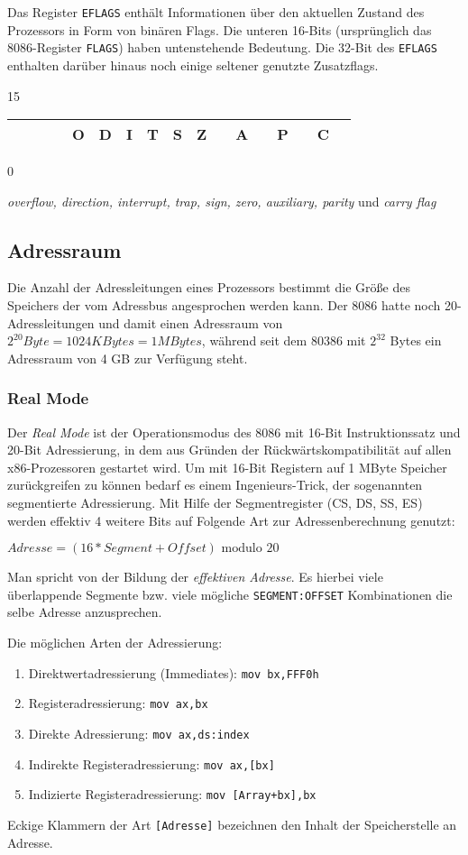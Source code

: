 Das Register {\tt EFLAGS} enthält Informationen über den aktuellen Zustand des Prozessors in Form von binären Flags. Die unteren 16-Bits (ursprünglich das 8086-Register {\tt FLAGS}) haben untenstehende Bedeutung. Die 32-Bit des {\tt EFLAGS} enthalten darüber hinaus noch einige seltener genutzte Zusatzflags.

{\small 15}
\begin{tabular}{|c|c|c|c|c|c|c|c|c|c|c|c|c|c|c|c|c|}
\hline & & & & O & D & I & T & S & Z & & A & & P & & C \\
\hline
\end{tabular}
{\small 0}

\emph{overflow, direction, interrupt, trap, sign, zero, auxiliary, parity}
und \emph{carry flag}

\subsection{Adressraum}

Die Anzahl der Adressleitungen eines Prozessors bestimmt die Größe des Speichers der vom Adressbus angesprochen werden kann. Der 8086 hatte noch 20-Adressleitungen und damit einen Adressraum von $2^20 Byte = 1024 KBytes = 1 MBytes$, während seit dem 80386 mit $2^32$ Bytes ein Adressraum von 4 GB zur Verfügung steht.

\subsubsection{Real Mode}

Der \emph{Real Mode} ist der Operationsmodus des 8086 mit 16-Bit Instruktionssatz und 20-Bit Adressierung, in dem aus Gründen der Rückwärtskompatibilität auf allen x86-Prozessoren gestartet wird. Um mit 16-Bit Registern auf 1 MByte Speicher zurückgreifen zu können bedarf es einem Ingenieurs-Trick, der sogenannten segmentierte Adressierung. Mit Hilfe der Segmentregister (CS, DS, SS, ES) werden effektiv 4 weitere Bits auf Folgende Art zur Adressenberechnung genutzt:

$Adresse = (16 * Segment + Offset) \text{ modulo } 20$

Man spricht von der Bildung der \emph{effektiven Adresse}. Es hierbei viele überlappende Segmente bzw. viele mögliche \texttt{SEGMENT:OFFSET} Kombinationen die selbe Adresse anzusprechen.

Die möglichen Arten der Adressierung:

\begin{enumerate}
\item Direktwertadressierung (Immediates): {\tt mov bx,FFF0h}
\item Registeradressierung: {\tt mov 	ax,bx}
\item Direkte Adressierung: {\tt mov 	ax,ds:index}
\item Indirekte Registeradressierung: {\tt mov ax,[bx]}
\item Indizierte Registeradressierung: {\tt mov [Array+bx],bx}
\end{enumerate}
Eckige Klammern der Art {\tt [Adresse]} bezeichnen den Inhalt der Speicherstelle an Adresse.

